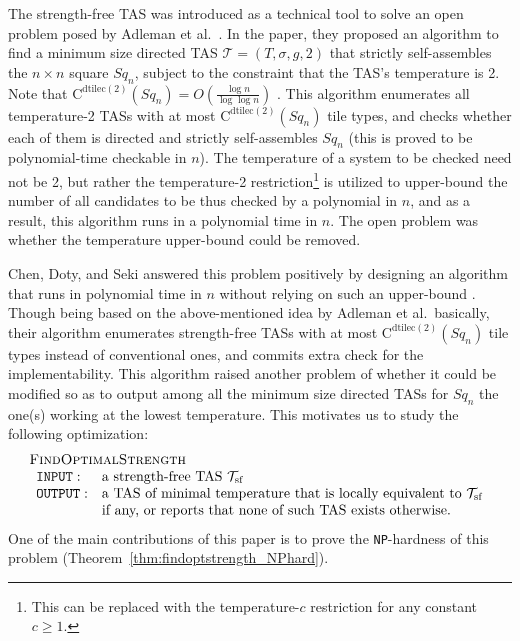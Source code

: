 \documentclass{article}
\theoremstyle{remark}
\theoremstyle{definition}
\newcommand{\tas}{\ensuremath{\mathcal{T}}}
\newcommand{\dtilec}[1]{\ensuremath{\mathrm{C}^{\mathrm{dtilec}(#1)}}}
\newcommand{\findoptstrength}{\ensuremath{\mbox{\sc FindOptimalStrength}}}
\newcommand{\NP}{{\tt NP}}
\renewcommand{\square}[1]{\ensuremath{\mathit{Sq}_{#1}}}
\begin{document}
The strength-free TAS was introduced as a technical tool to solve an open problem posed by Adleman et al.~\cite{AdChGoHuKeEsRo2002}. 
In the paper, they proposed an algorithm to find a minimum size directed TAS $\tas = (T, \sigma, g, 2)$ that strictly self-assembles the $n \times n$ square $\square{n}$, subject to the constraint that the TAS's temperature is 2. 
Note that $\dtilec{2}(\square{n}) = O(\frac{\log n}{\log \log n})$ \cite{AdChGoHu2001}. 
This algorithm enumerates all temperature-2 TASs with at most $\dtilec{2}(\square{n})$ tile types, and checks whether each of them is directed and strictly self-assembles $\square{n}$ (this is proved to be polynomial-time checkable in $n$). 
The temperature of a system to be checked need not be 2, but rather the temperature-2 restriction\footnote{This can be replaced with the temperature-$c$ restriction for any constant $c \ge 1$.} is utilized to upper-bound the number of all candidates to be thus checked by a polynomial in $n$, and as a result, this algorithm runs in a polynomial time in $n$. 
The open problem was whether the temperature upper-bound could be removed. 

Chen, Doty, and Seki answered this problem positively by designing an algorithm that runs in polynomial time in $n$ without relying on such an upper-bound \cite{ChenDotySeki2011}. 
Though being based on the above-mentioned idea by Adleman et al.~basically, their algorithm enumerates strength-free TASs with at most $\dtilec{2}(\square{n})$ tile types instead of conventional ones, and commits extra check for the implementability. 
This algorithm raised another problem of whether it could be modified so as to output among all the minimum size directed TASs for $\square{n}$ the one(s) working at the lowest temperature. 
This motivates us to study the following optimization: 
\[
\begin{array}{l}
\findoptstrength \\
\begin{array}{ll}
{\tt INPUT:}  	& \mbox{a strength-free TAS $\tas_{\rm sf}$} \\
{\tt OUTPUT:} 	& \mbox{a TAS of minimal temperature that is locally equivalent to $\tas_{\rm sf}$} \\
		& \mbox{if any, or reports that none of such TAS exists otherwise}. 
\end{array}
\end{array}
\]
One of the main contributions of this paper is to prove the \NP-hardness of this problem (Theorem~\ref{thm:findoptstrength_NPhard}). 
\end{document}
